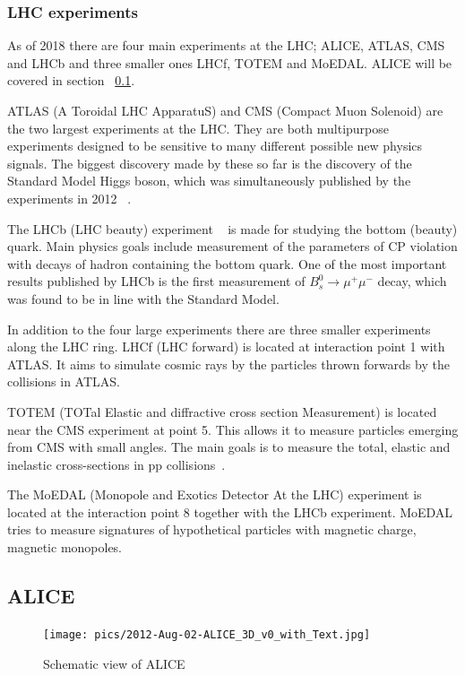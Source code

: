 \subsubsection{LHC experiments}
As of 2018 there are four main experiments at the LHC; ALICE, ATLAS, CMS and LHCb and three smaller ones LHCf, TOTEM and MoEDAL. ALICE will be covered in section ~\ref{sec:alice}. 

ATLAS (A Toroidal LHC ApparatuS) and CMS (Compact Muon Solenoid) are the two largest experiments at the LHC. They are both multipurpose experiments designed to be sensitive to many different possible new physics signals. The biggest discovery made by these so far is the discovery of the Standard Model Higgs boson, which was simultaneously published by the experiments in 2012 ~\cite{Atlashiggs, CMShiggs}.

The LHCb (LHC beauty) experiment ~\cite{LHCb} is made for studying the bottom (beauty) quark. Main physics goals include measurement of the parameters of CP violation with decays of hadron containing the bottom quark. One of the most important results published by LHCb is the first measurement of $B_s^0\rightarrow \mu^+ \mu^-$ decay, which was found to be in line with the Standard Model.

In addition to the four large experiments there are three smaller experiments along the LHC ring. LHCf (LHC forward) is located at interaction point 1 with ATLAS. It aims to simulate cosmic rays by the particles thrown forwards by the collisions in ATLAS.

TOTEM (TOTal Elastic and diffractive cross section Measurement) is located near the CMS experiment at point 5. This allows it to measure particles emerging from CMS with small angles. The main goals is to measure the total, elastic and inelastic cross-sections in pp collisions~\cite{TOTEM}.

The MoEDAL (Monopole and Exotics Detector At the LHC) experiment is located at the interaction point 8 together with the LHCb experiment. MoEDAL tries to measure signatures of hypothetical particles with magnetic charge, magnetic monopoles.




\subsection{ALICE}
\label{sec:alice}


\begin{figure}[htb]
\centering
\texttt{[image: pics/2012-Aug-02-ALICE\_3D\_v0\_with\_Text.jpg]}
\caption[ALICE]{Schematic view of ALICE}
\label{fig:alice}
\end{figure}


